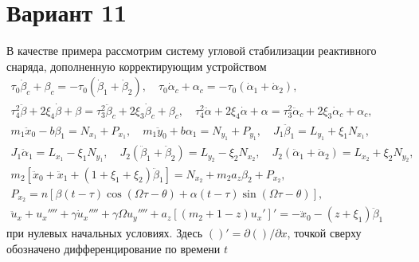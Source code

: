\documentclass{article}
\begin{document}
\section*{Вариант 11}

В качестве примера рассмотрим систему угловой стабилизации реактивного снаряда, дополненную корректирующим устройством
\vspace{-0.25em}
\begin{gather}
\tau_0\dot{\beta}_c + \beta_c = -\tau_0(\dot{\beta}_1 + \dot{\beta}_2), \quad
\tau_0\dot{\alpha}_c + \alpha_c = -\tau_0(\dot{\alpha}_1 + \dot{\alpha}_2), \nonumber\\
\tau_4^2\ddot{\beta} + 2\xi_4\dot{\beta} + \beta = \tau_3^2\ddot{\beta}_c + 2\xi_3\dot{\beta}_c + \beta_c, \quad
\tau_4^2\ddot{\alpha} + 2\xi_4\dot{\alpha} + \alpha = \tau_3^2\ddot{\alpha}_c + 2\xi_3\dot{\alpha}_c + \alpha_c, \nonumber\\
m_1\ddot{x}_0 - b\beta_1 = N_{x_1} + P_{x_1}, \quad
m_1\ddot{y}_0 + b\alpha_1 = N_{y_1} + P_{y_1}, \quad
J_1\ddot{\beta}_1 = L_{y_1} + \xi_1 N_{x_1}, \nonumber\\
J_1\ddot{\alpha}_1 = L_{x_1} - \xi_1 N_{y_1}, \quad
J_2(\ddot{\beta}_1 + \ddot{\beta}_2) = L_{y_2} - \xi_2 N_{x_2}, \quad
J_2(\ddot{\alpha}_1 + \ddot{\alpha}_2) = L_{x_2} + \xi_2 N_{y_2}, \label{eq:1}\\
m_2[\ddot{x}_0 + \ddot{x}_1 + (1 + \xi_1 + \xi_2)\ddot{\beta}_1] = N_{x_2} + m_2 a_z \beta_2 + P_{x_2}, \nonumber\\
P_{x_2} = n[\beta(t - \tau)\cos(\Omega\tau - \theta) + \alpha(t - \tau)\sin(\Omega\tau - \theta)], \nonumber\\
\ddot{u}_x + u_x'''' + \gamma\dot{u}_x'''' + \gamma\Omega u_y'''' + a_z[(m_2 + 1 - z)u_x']' = -\ddot{x}_0 - (z + \xi_1)\ddot{\beta}_1 \nonumber
\end{gather}
при нулевых начальных условиях. Здесь $()' = \partial()/\partial x$, точкой сверху обозначено дифференцирование по времени $t$
\end{document}
